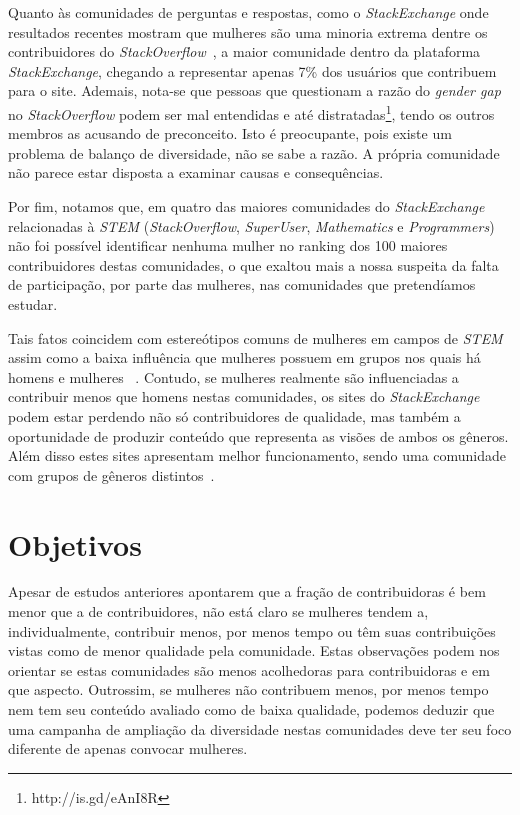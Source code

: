 Quanto às comunidades de perguntas e respostas, como o \emph{StackExchange} onde resultados recentes mostram que mulheres são uma minoria extrema dentre os contribuidores do \emph{StackOverflow}~\cite{Vasilescu27092013}, a maior comunidade dentro da plataforma \emph{StackExchange}, chegando a representar apenas 7\% dos usuários que contribuem para o site. Ademais, nota-se que pessoas que questionam a razão do \emph{gender gap} no \emph{StackOverflow} podem ser mal entendidas e até distratadas\footnote{http://is.gd/eAnI8R}, tendo os outros membros as acusando de preconceito. Isto é preocupante, pois existe um problema de balanço de diversidade, não se sabe a razão. A própria comunidade não parece estar disposta a examinar causas e consequências.

Por fim, notamos que, em quatro das maiores comunidades do \emph{StackExchange} relacionadas à \emph{STEM} (\emph{StackOverflow}, \emph{SuperUser}, \emph{Mathematics} e \emph{Programmers}) não foi possível identificar nenhuma mulher no ranking dos 100 maiores contribuidores destas comunidades, o que exaltou mais a nossa suspeita da falta de participação, por parte das mulheres, nas comunidades que pretendíamos estudar.

Tais fatos coincidem com estereótipos comuns de mulheres em campos de \emph{STEM}~\cite{spencer1999stereotype} assim como a baixa influência que mulheres possuem em grupos nos quais há homens e mulheres ~\cite{karpowitz2012gender}. Contudo, se mulheres realmente são influenciadas a contribuir menos que homens nestas comunidades, os sites do \emph{StackExchange} podem estar perdendo não só contribuidores de qualidade, mas também a oportunidade de produzir conteúdo que representa as visões de ambos os gêneros. Além disso estes sites apresentam melhor funcionamento, sendo uma comunidade com grupos de gêneros distintos~\cite{marshall1975boys}.


\section{Objetivos}

Apesar de estudos anteriores apontarem que a fração de contribuidoras é bem menor que a de contribuidores, não está claro se mulheres tendem a, individualmente, contribuir menos, por menos tempo ou têm suas contribuições vistas como de menor qualidade pela comunidade. Estas observações podem nos orientar se estas comunidades são menos acolhedoras para contribuidoras e em que aspecto. Outrossim, se mulheres não contribuem menos, por menos tempo nem tem seu conteúdo avaliado como de baixa qualidade, podemos deduzir que uma campanha de ampliação da diversidade nestas comunidades deve ter seu foco diferente de apenas convocar mulheres.

